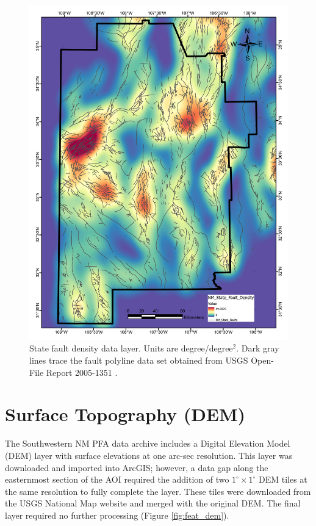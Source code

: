 \begin{figure}[H]
\centering
\includegraphics[width=0.75\linewidth]{templates/images/Figure-StateFaultDensity.pdf}
\caption[State fault density data layer]{State fault density data layer. Units are degree/degree$^2$. Dark gray lines trace the fault polyline data set obtained from USGS Open-File Report 2005-1351 \protect\citep{stoeser_usgs_2005}.}
\label{fig:state_faults}
\end{figure}

\section{Surface Topography (DEM)}\label{app:dl_dem}

The Southwestern NM PFA data archive \citep{kelley_geothermal_2015} includes a Digital Elevation Model (DEM) layer with surface elevations at one arc-sec resolution. This layer was downloaded and imported into ArcGIS; however, a data gap along the easternmost section of the AOI required the addition of two \(1^\circ\times1^\circ\) DEM tiles at the same resolution to fully complete the layer. These tiles were downloaded from the USGS National Map website \citep{usgs_tnm_2021} and merged with the original DEM. The final layer required no further processing (Figure \ref{fig:feat_dem}).

